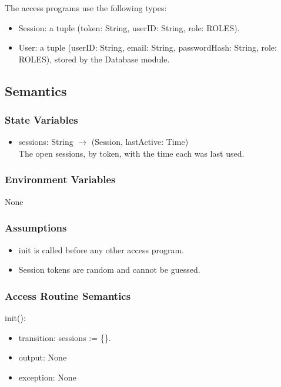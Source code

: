 \documentclass[12pt, titlepage]{article}
\begin{document}
\noindent The access programs use the following types:
\begin{itemize}
\item Session: a tuple (token: String, userID: String, role: ROLES).
\item User: a tuple (userID: String, email: String, passwordHash: String,
  role: ROLES), stored by the Database module.
\end{itemize}

\subsection{Semantics}

\subsubsection{State Variables}
\begin{itemize}
\item sessions: String $\rightarrow$ (Session, lastActive: Time)\\
The open sessions, by token, with the time each was last used.
\end{itemize}

\subsubsection{Environment Variables}
None

\subsubsection{Assumptions}
\begin{itemize}
\item init is called before any other access program.
\item Session tokens are random and cannot be guessed.
\end{itemize}

\subsubsection{Access Routine Semantics}

\noindent init():
\begin{itemize}
\item transition: sessions := \{\}.
\item output: None
\item exception: None
\end{itemize}
\end{document}

